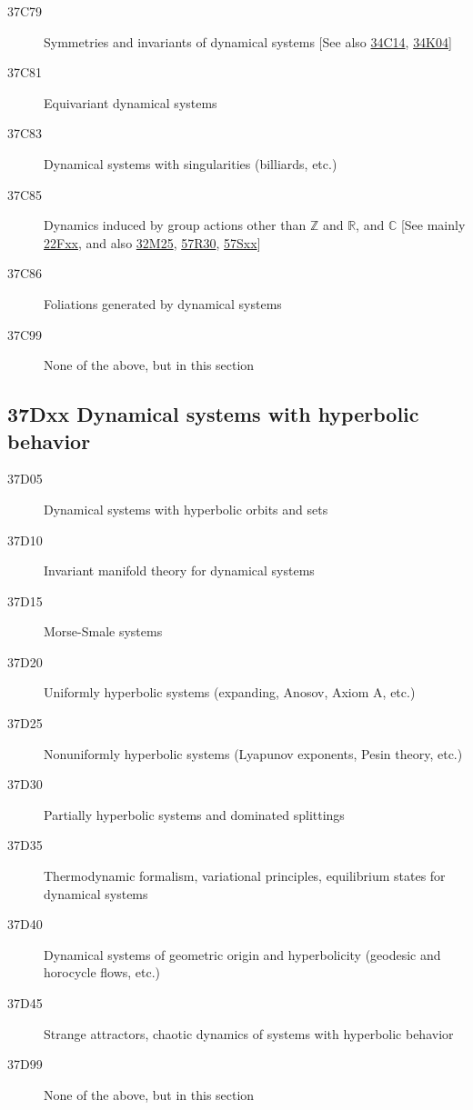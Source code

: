 \documentclass[letterpaper]{article}
\begin{document}
\begin{description}
\item [37C79]\label{37C79} Symmetries and invariants of dynamical systems [See also \hyperref[34C14]{34C14}, \hyperref[34K04]{34K04}]
\item [37C81]\label{37C81} Equivariant dynamical systems
\item [37C83]\label{37C83} Dynamical systems with singularities (billiards, etc.)
\item [37C85]\label{37C85} Dynamics induced by group actions other than $\mathbb{Z}$ and $\mathbb{R}$, and $\mathbb{C}$ [See mainly \hyperref[22Fxx]{22Fxx}, and also \hyperref[32M25]{32M25}, \hyperref[57R30]{57R30}, \hyperref[57Sxx]{57Sxx}]
\item [37C86]\label{37C86} Foliations generated by dynamical systems
\item [37C99]\label{37C99} None of the above, but in this section
\end{description}
\subsection*{37Dxx  Dynamical systems with hyperbolic behavior }\label{37Dxx}
\begin{description}  
\item [37D05]\label{37D05} Dynamical systems with hyperbolic orbits and sets
\item [37D10]\label{37D10} Invariant manifold theory for dynamical systems
\item [37D15]\label{37D15} Morse-Smale systems
\item [37D20]\label{37D20} Uniformly hyperbolic systems (expanding, Anosov, Axiom A, etc.)
\item [37D25]\label{37D25} Nonuniformly hyperbolic systems (Lyapunov exponents, Pesin theory, etc.)
\item [37D30]\label{37D30} Partially hyperbolic systems and dominated splittings
\item [37D35]\label{37D35}  Thermodynamic formalism, variational principles, equilibrium states for dynamical systems
\item [37D40]\label{37D40} Dynamical systems of geometric origin and hyperbolicity (geodesic and horocycle flows, etc.)
\item [37D45]\label{37D45} Strange attractors, chaotic dynamics of systems with hyperbolic behavior
\item [37D99]\label{37D99} None of the above, but in this section
\end{description}
\end{document}
